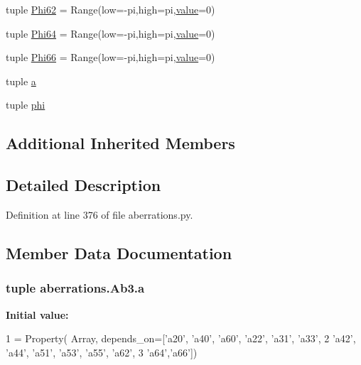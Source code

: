 \begin{DoxyCompactItemize}
\item 
tuple \hyperlink{classaberrations_1_1_ab3_a72bff7546fac1a0b8855aa21b007e6ab}{Phi62} = Range(low=-\/pi,high=pi,\hyperlink{read_config_file_8m_afcc7a4b78ecd8fa7e713f8cfa0f51017}{value}=0)
\item 
tuple \hyperlink{classaberrations_1_1_ab3_ae8134a4d98473fde855a519ec2e24289}{Phi64} = Range(low=-\/pi,high=pi,\hyperlink{read_config_file_8m_afcc7a4b78ecd8fa7e713f8cfa0f51017}{value}=0)
\item 
tuple \hyperlink{classaberrations_1_1_ab3_ac572bbd6cfdf9dc00c3325936cfcb7dd}{Phi66} = Range(low=-\/pi,high=pi,\hyperlink{read_config_file_8m_afcc7a4b78ecd8fa7e713f8cfa0f51017}{value}=0)
\item 
tuple \hyperlink{classaberrations_1_1_ab3_ae439d45c87584dc4d93fe544dfbb02a7}{a}
\item 
tuple \hyperlink{classaberrations_1_1_ab3_afd6e5e64c14cfe35b8128a781f58f767}{phi}
\end{DoxyCompactItemize}
\subsection*{Additional Inherited Members}


\subsection{Detailed Description}


Definition at line 376 of file aberrations.\-py.



\subsection{Member Data Documentation}
\hypertarget{classaberrations_1_1_ab3_ae439d45c87584dc4d93fe544dfbb02a7}{
\subsubsection[{a}]{\setlength{\rightskip}{0pt plus 5cm}tuple aberrations.\-Ab3.\-a\hspace{0.3cm}{\ttfamily [static]}}}\label{classaberrations_1_1_ab3_ae439d45c87584dc4d93fe544dfbb02a7}
{\bfseries Initial value\-:}
\begin{DoxyCode}
1 = Property( Array, depends\_on=[\textcolor{stringliteral}{'a20'}, \textcolor{stringliteral}{'a40'}, \textcolor{stringliteral}{'a60'}, \textcolor{stringliteral}{'a22'}, \textcolor{stringliteral}{'a31'}, \textcolor{stringliteral}{'a33'},
2                                      \textcolor{stringliteral}{'a42'}, \textcolor{stringliteral}{'a44'}, \textcolor{stringliteral}{'a51'}, \textcolor{stringliteral}{'a53'}, \textcolor{stringliteral}{'a55'}, \textcolor{stringliteral}{'a62'},
3                                      \textcolor{stringliteral}{'a64'},\textcolor{stringliteral}{'a66'}])
\end{DoxyCode}


